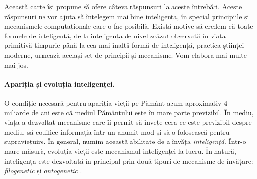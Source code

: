 \documentclass[../../book-main_ro.tex]{subfiles}
\begin{document}
Această carte își propune să ofere câteva răspunsuri la aceste întrebări. Aceste răspunsuri ne vor ajuta să înțelegem mai bine inteligența, în special principiile și mecanismele computaționale care o fac posibilă. Există motive să credem că toate formele de inteligență, de la inteligența de nivel scăzut observată în viața primitivă timpurie până la cea mai înaltă formă de inteligență, practica științei moderne, urmează același set de principii și mecanisme. Vom elabora mai multe mai jos.

\paragraph{Apariția și evoluția inteligenței.}

O condiție necesară pentru apariția vieții pe Pământ acum aproximativ 4 miliarde de ani este că mediul Pământului este în mare parte previzibil. În mediu, viața a dezvoltat mecanisme care îi permit să învețe ceea ce este previzibil despre mediu, să codifice informația într-un anumit mod și să o folosească pentru supraviețuire. În general, numim această abilitate de a învăța {\em inteligență}. Într-o mare măsură, evoluția vieții este mecanismul inteligenței la lucru. În natură, inteligența este dezvoltată în principal prin două tipuri de mecanisme de învățare: {\em filogenetic} și {\em ontogenetic} \cite{Wiener-Cybernetics-1961}.
\end{document}
